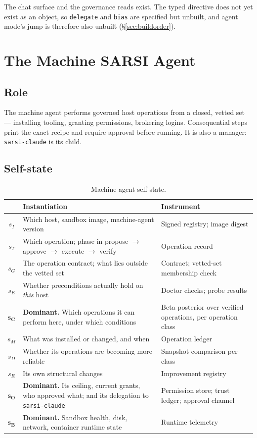 \documentclass[11pt]{article}
\newcommand{\code}[1]{\texttt{\small #1}}
\begin{document}
The chat surface and the governance reads exist. The typed directive does not yet exist as an object, so \code{delegate} and \code{bias} are specified but unbuilt, and agent mode's jump is therefore also unbuilt (\S\ref{sec:buildorder}).

\section{The Machine SARSI Agent}
\label{sec:machine}

\subsection{Role}

The machine agent performs governed host operations from a closed, vetted set --- installing tooling, granting permissions, brokering logins. Consequential steps print the exact recipe and require approval before running. It is also a manager: \code{sarsi-claude} is its child.

\subsection{Self-state}

\begin{table}[h]
\centering\small
\caption{Machine agent self-state.}
\label{tab:mac-state}
\begin{tabular}{@{}cL{5.6cm}L{6.4cm}@{}}
\toprule
& \textbf{Instantiation} & \textbf{Instrument} \\
\midrule
$s_I$ & Which host, sandbox image, machine-agent version & Signed registry; image digest \\
$s_T$ & Which operation; phase in propose $\to$ approve $\to$ execute $\to$ verify & Operation record \\
$s_G$ & The operation contract; what lies outside the vetted set & Contract; vetted-set membership check \\
$s_E$ & Whether preconditions actually hold on \emph{this} host & Doctor checks; probe results \\
$\mathbf{s_C}$ & \textbf{Dominant.} Which operations it can perform here, under which conditions & Beta posterior over verified operations, per operation class \\
$s_M$ & What was installed or changed, and when & Operation ledger \\
$s_D$ & Whether its operations are becoming more reliable & Snapshot comparison per class \\
$s_R$ & Its own structural changes & Improvement registry \\
$\mathbf{s_O}$ & \textbf{Dominant.} Its ceiling, current grants, who approved what; and its delegation to \code{sarsi-claude} & Permission store; trust ledger; approval channel \\
$\mathbf{s_B}$ & \textbf{Dominant.} Sandbox health, disk, network, container runtime state & Runtime telemetry \\
\bottomrule
\end{tabular}
\end{table}
\end{document}
